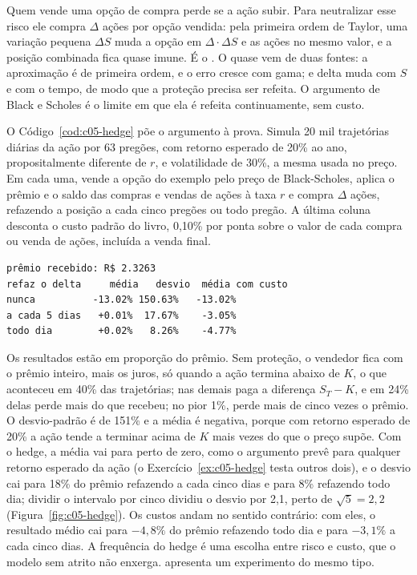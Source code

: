 Quem vende uma opção de compra perde se a ação subir. Para neutralizar esse risco ele compra $\Delta$ ações por opção vendida: pela primeira ordem de Taylor, uma variação pequena $\Delta S$ muda a opção em $\Delta\cdot\Delta S$ e as ações no mesmo valor, e a posição combinada fica quase imune. É o . O quase vem de duas fontes: a aproximação é de primeira ordem, e o erro cresce com gama; e delta muda com $S$ e com o tempo, de modo que a proteção precisa ser refeita. O argumento de Black e Scholes é o limite em que ela é refeita continuamente, sem custo.

O Código~\ref{cod:c05-hedge} põe o argumento à prova. Simula 20 mil trajetórias diárias da ação por 63 pregões, com retorno esperado de 20\% ao ano, propositalmente diferente de $r$, e volatilidade de 30\%, a mesma usada no preço. Em cada uma, vende a opção do exemplo pelo preço de Black-Scholes, aplica o prêmio e o saldo das compras e vendas de ações à taxa $r$ e compra $\Delta$ ações, refazendo a posição a cada cinco pregões ou todo pregão. A última coluna desconta o custo padrão do livro, 0,10\% por ponta sobre o valor de cada compra ou venda de ações, incluída a venda final.


\begin{lstlisting}[style=saida]
prêmio recebido: R$ 2.3263
refaz o delta     média   desvio  média com custo
nunca          -13.02% 150.63%   -13.02%
a cada 5 dias   +0.01%  17.67%    -3.05%
todo dia        +0.02%   8.26%    -4.77%
\end{lstlisting}

Os resultados estão em proporção do prêmio. Sem proteção, o vendedor fica com o prêmio inteiro, mais os juros, só quando a ação termina abaixo de $K$, o que aconteceu em 40\% das trajetórias; nas demais paga a diferença $S_T - K$, e em 24\% delas perde mais do que recebeu; no pior 1\%, perde mais de cinco vezes o prêmio. O desvio-padrão é de 151\% e a média é negativa, porque com retorno esperado de 20\% a ação tende a terminar acima de $K$ mais vezes do que o preço supõe. Com o hedge, a média vai para perto de zero, como o argumento prevê para qualquer retorno esperado da ação (o Exercício~\ref{ex:c05-hedge} testa outros dois), e o desvio cai para 18\% do prêmio refazendo a cada cinco dias e para 8\% refazendo todo dia; dividir o intervalo por cinco dividiu o desvio por 2,1, perto de $\sqrt{5} = 2,2$ (Figura~\ref{fig:c05-hedge}). Os custos andam no sentido contrário: com eles, o resultado médio cai para $-4,8\%$ do prêmio refazendo todo dia e para $-3,1\%$ a cada cinco dias. A frequência do hedge é uma escolha entre risco e custo, que o modelo sem atrito não enxerga. \citet{hull2022} apresenta um experimento do mesmo tipo.

